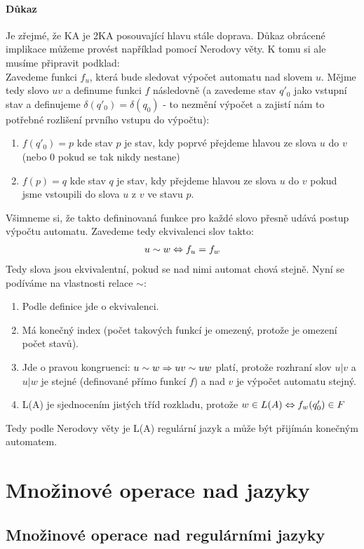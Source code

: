 \documentclass[a4paper,12pt,titlepage]{article}
\begin{document}
\paragraph{Důkaz}
Je zřejmé, že KA je 2KA posouvající hlavu stále doprava. Důkaz obrácené
implikace můžeme provést například pomocí Nerodovy věty. K tomu si ale musíme
připravit podklad: \\
Zavedeme funkci $f_u$, která bude sledovat výpočet automatu nad slovem $u$.
Mějme tedy slovo $uv$ a definume funkci $f$ následovně (a zavedeme stav $q'_0$
jako vstupní stav a definujeme $\delta(q'_0) = \delta(q_0)$ - to nezmění výpočet
a zajistí nám to potřebné rozlišení prvního vstupu do výpočtu):
\begin{enumerate}
	\item $f(q'_0) = p$ kde stav $p$ je stav, kdy poprvé přejdeme hlavou ze slova
	$u$ do $v$ (nebo 0 pokud se tak nikdy nestane)
	\item $f(p) = q$ kde stav $q$ je stav, kdy přejdeme hlavou ze slova $u$ do
	$v$ pokud jsme vstoupili do slova $u$ z $v$ ve stavu $p$.
\end{enumerate}
Všimneme si, že takto defininovaná funkce pro každé slovo přesně udává postup
výpočtu automatu. Zavedeme tedy ekvivalenci slov takto:
\begin{align}
	u \sim w \Leftrightarrow f_u = f_w
\end{align}
Tedy slova jsou ekvivalentní, pokud se nad nimi automat chová stejně. Nyní se
podíváme na vlastnosti relace $\sim$:
\begin{enumerate}
	\item Podle definice jde o ekvivalenci.
	\item Má konečný index (počet takových funkcí je omezený, protože je omezení
	počet stavů).
	\item Jde o pravou kongruenci: $u\sim w \Rightarrow uv \sim uw$ platí, protože
	rozhraní slov $u|v$ a $u|w$ je stejné (definované přímo funkcí $f$) a nad
	$v$ je výpočet automatu stejný.
	\item L(A) je sjednocením jistých tříd rozkladu, protože $w \in L(A) \Leftrightarrow
	f_w(q'_0) \in F$
\end{enumerate}
Tedy podle Nerodovy věty je L(A) regulární jazyk a může být přijímán konečným
automatem.


\section{Množinové operace nad jazyky}
\setcounter{equation}{0}
\subsection{Množinové operace nad regulárními jazyky}
\setcounter{equation}{0}
\end{document}

